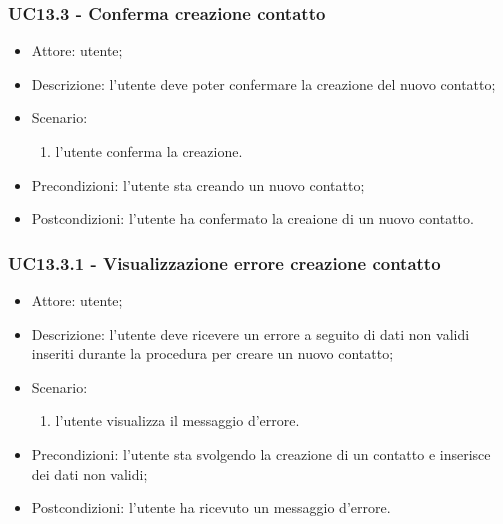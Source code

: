 \subsubsection{UC13.3 - Conferma creazione contatto} \label{sec: UC13.3}
\begin{itemize}
    \item Attore: utente;
    \item Descrizione: l'utente deve poter confermare la creazione del nuovo contatto;
    \item Scenario:
        \begin{enumerate}
        \item l'utente conferma la creazione.
        \end{enumerate}
    
    \item Precondizioni: l'utente sta creando un nuovo contatto;
    \item Postcondizioni: l'utente ha confermato la creaione di un nuovo contatto.
\end{itemize}


\subsubsection{UC13.3.1 - Visualizzazione errore creazione contatto} \label{sec: UC13.3.1}
\begin{itemize}
    \item Attore: utente;
    \item Descrizione: l'utente deve ricevere un errore a seguito di dati non validi inseriti durante la procedura per creare un nuovo contatto;
    \item Scenario:
        \begin{enumerate}
        \item l'utente visualizza il messaggio d'errore.
        \end{enumerate}
    
    \item Precondizioni: l'utente sta svolgendo la creazione di un contatto e inserisce dei dati non validi;
    \item Postcondizioni: l'utente ha ricevuto un messaggio d'errore.
\end{itemize}


